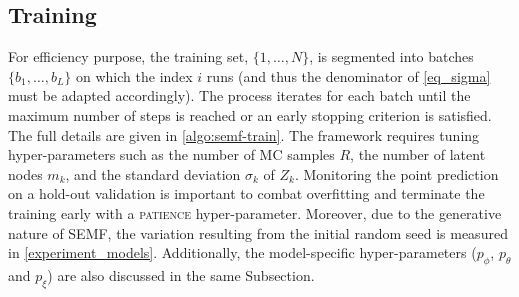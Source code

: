 \documentclass{article}
\begin{document}

\subsection{Training}
\label{semf_training}
For efficiency purpose, the training set, $\{1, \ldots, N\}$, is segmented into batches \( \{b_1, \ldots, b_L\} \) on which the index $i$ runs (and thus the denominator of \autoref{eq_sigma} must be adapted accordingly). The process iterates for each batch until the maximum number of steps is reached or an early stopping criterion is satisfied. The full details are given in \autoref{algo:semf-train}. The framework requires tuning hyper-parameters such as the number of MC samples $R$, the number of latent nodes $m_k$, and the standard deviation $\sigma_{k}$ of $Z_k$. Monitoring the point prediction on a hold-out validation is important to combat overfitting and terminate the training early with a \textsc{patience} hyper-parameter. Moreover, due to the generative nature of SEMF, the variation resulting from the initial random seed is measured in \autoref{experiment_models}. Additionally, the model-specific hyper-parameters ($p_\phi$, $p_\theta$ and $p_\xi$) are also discussed in the same Subsection.
\end{document}
